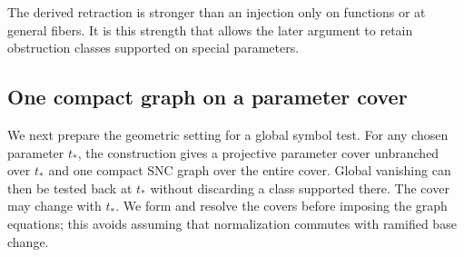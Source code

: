 The derived retraction is stronger than an injection only on functions or
at general fibers.  It is this strength that allows the later argument
to retain obstruction classes supported on special parameters.

\subsection{One compact graph on a parameter cover}

We next prepare the geometric setting for a global symbol test.  For any
chosen parameter \(t_*\), the construction gives a projective parameter
cover unbranched over \(t_*\) and one compact SNC graph over the entire
cover.  Global vanishing can then be tested back at \(t_*\) without
discarding a class supported there.  The cover may change with \(t_*\).
We form and resolve the covers before imposing the graph equations; this
avoids assuming that normalization commutes with ramified base change.

